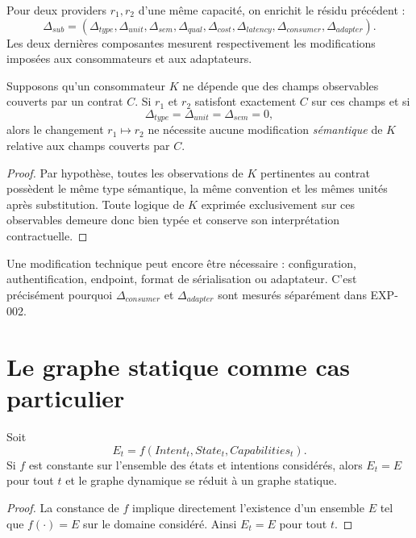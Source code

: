 Pour deux providers $r_1,r_2$ d'une même capacité, on enrichit le résidu précédent :
\[
\Delta_{sub}=
(\Delta_{type},\Delta_{unit},\Delta_{sem},\Delta_{qual},
\Delta_{cost},\Delta_{latency},\Delta_{consumer},\Delta_{adapter}).
\]
Les deux dernières composantes mesurent respectivement les modifications imposées aux consommateurs et aux adaptateurs.

\begin{proposition}
Supposons qu'un consommateur $K$ ne dépende que des champs observables couverts par un contrat $C$. Si $r_1$ et $r_2$ satisfont exactement $C$ sur ces champs et si
\[
\Delta_{type}=\Delta_{unit}=\Delta_{sem}=0,
\]
alors le changement $r_1\mapsto r_2$ ne nécessite aucune modification \emph{sémantique} de $K$ relative aux champs couverts par $C$.
\end{proposition}

\begin{proof}
Par hypothèse, toutes les observations de $K$ pertinentes au contrat possèdent le même type sémantique, la même convention et les mêmes unités après substitution. Toute logique de $K$ exprimée exclusivement sur ces observables demeure donc bien typée et conserve son interprétation contractuelle.
\end{proof}

\begin{limitation}
Une modification technique peut encore être nécessaire : configuration, authentification, endpoint, format de sérialisation ou adaptateur. C'est précisément pourquoi $\Delta_{consumer}$ et $\Delta_{adapter}$ sont mesurés séparément dans EXP-002.
\end{limitation}

\section{Le graphe statique comme cas particulier}

\begin{proposition}
Soit
\[
E_t=f(Intent_t,State_t,Capabilities_t).
\]
Si $f$ est constante sur l'ensemble des états et intentions considérés, alors $E_t=E$ pour tout $t$ et le graphe dynamique se réduit à un graphe statique.
\end{proposition}

\begin{proof}
La constance de $f$ implique directement l'existence d'un ensemble $E$ tel que $f(\cdot)=E$ sur le domaine considéré. Ainsi $E_t=E$ pour tout $t$.
\end{proof}


